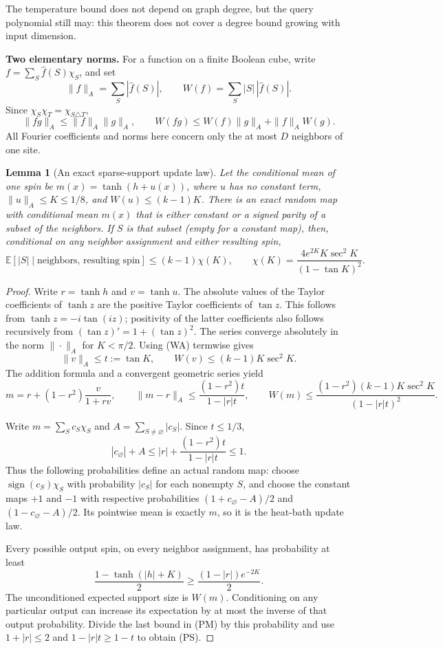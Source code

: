 \documentclass[11pt]{article}
\newtheorem{lemma}[theorem]{Lemma}
\theoremstyle{definition}
\theoremstyle{remark}
\newcounter{none}
\begin{document}
The temperature bound does not depend on graph degree, but the query
polynomial still may: this theorem does not cover a degree bound growing
with input dimension.

\textbf{Two elementary norms.}
For a function on a finite Boolean cube, write
\(f=\sum_S\widehat f(S)\chi_S\), and set
\[
 \|f\|_A=\sum_S|\widehat f(S)|,\qquad
 W(f)=\sum_S|S|\,|\widehat f(S)|.
\]
Since \(\chi_S\chi_T=\chi_{S\triangle T}\),
\[
 \|fg\|_A\le\|f\|_A\|g\|_A,\qquad
 W(fg)\le W(f)\|g\|_A+\|f\|_AW(g).
 \tag{WA}
\]
All Fourier coefficients and norms here concern only the at most
\(D\) neighbors of one site.

\begin{lemma}[An exact sparse-support update law]
\label{lem:resolution-dynamics-parity-law}
Let the conditional mean of one spin be
\(m(x)=\tanh(h+u(x))\), where
\(u\) has no constant term,
\(\|u\|_A\le K\le1/8\), and
\(W(u)\le(k-1)K\). There is an exact random map with conditional
mean \(m(x)\) that is either constant or a signed parity of a subset
of the neighbors. If \(S\) is that subset (empty for a constant map),
then, conditional on any neighbor assignment and either resulting spin,
\[
 \mathbb E[|S|\mid\text{neighbors, resulting spin}]
 \le (k-1)\chi(K),\qquad
 \chi(K)=\frac{4e^{2K}K\sec^2K}{(1-\tan K)^2}.
 \tag{PS}
\]
\end{lemma}

\begin{proof}
Write \(r=\tanh h\) and \(v=\tanh u\). The absolute values of
the Taylor coefficients of \(\tanh z\) are the positive Taylor
coefficients of \(\tan z\). This follows from
\(\tanh z=-i\tan(iz)\); positivity of the latter coefficients also
follows recursively from \((\tan z)'=1+(\tan z)^2\). The series
converge absolutely in the norm \(\|\cdot\|_A\) for \(K<\pi/2\).
Using (WA) termwise gives
\[
 \|v\|_A\le t:=\tan K,
 \qquad W(v)\le(k-1)K\sec^2 K.
\]
The addition formula and a convergent geometric series yield
\[
 m=r+(1-r^2)\frac{v}{1+rv},\qquad
 \|m-r\|_A\le\frac{(1-r^2)t}{1-|r|t},\qquad
 W(m)\le\frac{(1-r^2)(k-1)K\sec^2K}{(1-|r|t)^2}.
 \tag{PM}
\]

Write \(m=\sum_S c_S\chi_S\) and
\(A=\sum_{S\ne\varnothing}|c_S|\). Since \(t\le1/3\),
\[
 |c_\varnothing|+A
 \le |r|+\frac{(1-r^2)t}{1-|r|t}\le1.
\]
Thus the following probabilities define an actual random map:
choose \(\operatorname{sign}(c_S)\chi_S\) with probability
\(|c_S|\) for each nonempty \(S\), and choose the constant maps
\(+1\) and \(-1\) with respective probabilities
\((1+c_\varnothing-A)/2\) and
\((1-c_\varnothing-A)/2\). Its pointwise mean is exactly \(m\),
so it is the heat-bath update law.

Every possible output spin, on every neighbor assignment, has
probability at least
\[
 \frac{1-\tanh(|h|+K)}2
 \ge\frac{(1-|r|)e^{-2K}}2.
\]
The unconditioned expected support size is \(W(m)\). Conditioning
on any particular output can increase its expectation by at most the
inverse of that output probability. Divide the last bound in (PM) by
this probability and use \(1+|r|\le2\) and
\(1-|r|t\ge1-t\) to obtain (PS).
\end{proof}
\end{document}
